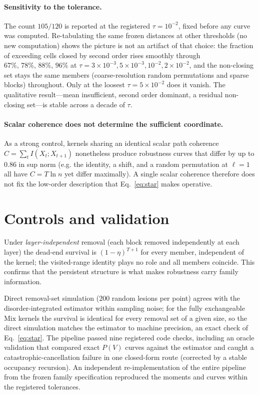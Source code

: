 \documentclass[aps,pre,twocolumn,superscriptaddress,floatfix,longbibliography]{revtex4-2}
\begin{document}
\paragraph{Sensitivity to the tolerance.}
The count $105/120$ is reported at the registered $\tau=10^{-2}$, fixed before any
curve was computed. Re-tabulating the same frozen distances at other thresholds
(no new computation) shows the picture is not an artifact of that choice: the
fraction of exceeding cells closed by second order rises smoothly through
$67\%,\,78\%,\,88\%,\,96\%$ at $\tau=3\times10^{-3},5\times10^{-3},10^{-2},
2\times10^{-2}$, and the non-closing set stays the same members (coarse-resolution
random permutations and sparse blocks) throughout. Only at the loosest
$\tau=5\times10^{-2}$ does it vanish. The qualitative result---mean insufficient,
second order dominant, a residual non-closing set---is stable across a decade of
$\tau$.

\paragraph{Scalar coherence does not determine the sufficient coordinate.}
As a strong control, kernels sharing an identical scalar path coherence
$C=\sum_t I(X_t;X_{t+1})$ nonetheless produce robustness curves that differ by up
to $0.86$ in sup norm (e.g. the identity, a shift, and a random permutation at
$\ell=1$ all have $C=T\ln n$ yet differ maximally). A single scalar coherence
therefore does not fix the low-order description that Eq.~\eqref{eq:star} makes
operative.

\section{Controls and validation}
\label{sec:controls}

Under \emph{layer-independent} removal (each block removed independently at each
layer) the dead-end survival is $(1-\eta)^{T+1}$ for every member, independent of
the kernel; the visited-range identity plays no role and all members coincide. This
confirms that the persistent structure is what makes robustness carry family
information.

Direct removal-set simulation ($200$ random lesions per point) agrees with the
disorder-integrated estimator within sampling noise; for the fully exchangeable
$\mathrm{Mix}$ kernels the survival is identical for every removal set of a given
size, so the direct simulation matches the estimator to machine precision, an exact
check of Eq.~\eqref{eq:star}. The pipeline passed nine registered code checks,
including an oracle validation that compared exact $P(V)$ curves against the
estimator and caught a catastrophic-cancellation failure in one closed-form route
(corrected by a stable occupancy recursion). An independent re-implementation of
the entire pipeline from the frozen family specification reproduced the moments and
curves within the registered tolerances.
\end{document}
